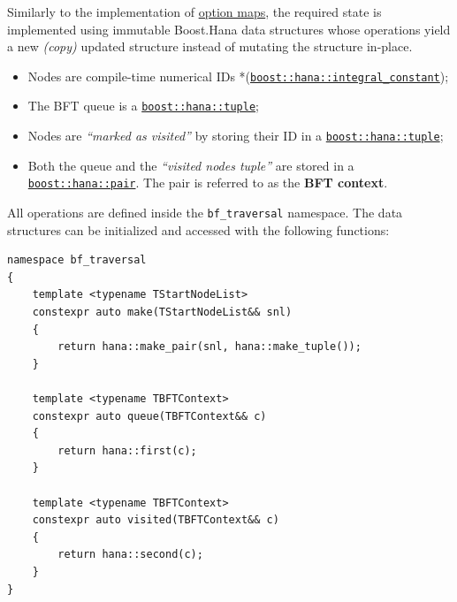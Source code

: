 \documentclass[twoside, 12pt, a4paper, openany]{book}
\begin{document}
Similarly to the implementation of
\protect\hyperlink{metaprogramming_option_maps}{option maps}, the
required state is implemented using immutable Boost.Hana data structures
whose operations yield a new \emph{(copy)} updated structure instead of
mutating the structure in-place.

\begin{itemize}
\item
  Nodes are compile-time numerical IDs
  *(\href{http://www.boost.org/doc/libs/1_61_0/libs/hana/doc/html/structboost_1_1hana_1_1integral__constant.html}{\texttt{boost::hana::integral_constant}});
\item
  The BFT queue is a
  \href{http://www.boost.org/doc/libs/1_61_0/libs/hana/doc/html/structboost_1_1hana_1_1tuple.html}{\texttt{boost::hana::tuple}};
\item
  Nodes are \emph{``marked as visited''} by storing their ID in a
  \href{http://www.boost.org/doc/libs/1_61_0/libs/hana/doc/html/structboost_1_1hana_1_1tuple.html}{\texttt{boost::hana::tuple}};
\item
  Both the queue and the \emph{``visited nodes tuple''} are stored in a
  \href{http://www.boost.org/doc/libs/1_61_0/libs/hana/doc/html/structboost_1_1hana_1_1pair.html}{\texttt{boost::hana::pair}}.
  The pair is referred to as the \textbf{BFT context}.
\end{itemize}

All operations are defined inside the
\texttt{bf_traversal}
namespace. The data structures can be initialized and accessed with the
following functions:

\begin{verbatim}
namespace bf_traversal
{
    template <typename TStartNodeList>
    constexpr auto make(TStartNodeList&& snl)
    {
        return hana::make_pair(snl, hana::make_tuple());
    }

    template <typename TBFTContext>
    constexpr auto queue(TBFTContext&& c)
    {
        return hana::first(c);
    }

    template <typename TBFTContext>
    constexpr auto visited(TBFTContext&& c)
    {
        return hana::second(c);
    }
}
\end{verbatim}
\end{document}

